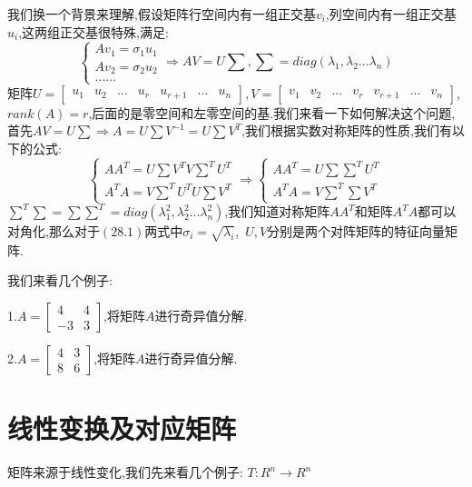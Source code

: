 \documentclass[oneside]{book}
\begin{document}
	我们换一个背景来理解,假设矩阵行空间内有一组正交基$v_{i}$,列空间内有一组正交基$u_{i}$,这两组正交基很特殊,满足:$$\left\{\begin{array}{c}
		Av_{1}=\sigma_{1}u_{1}\\Av_{2}=\sigma_{2}u_{2}\\......
	\end{array}\right.\Rightarrow AV=U\sum,\sum=diag(\lambda_{1},\lambda_{2}...\lambda_{n})$$
	矩阵$U=\left[\begin{array}{ccccccc}
		u_{1}&u_{2}&...&u_{r}&u_{r+1}&...&u_{n}
	\end{array}\right],V=\left[\begin{array}{ccccccc}
	v_{1}&v_{2}&...&v_{r}&v_{r+1}&...&v_{n}
\end{array}\right]$,$rank(A)=r$,后面的是零空间和左零空间的基.我们来看一下如何解决这个问题,首先$AV=U\sum\Rightarrow A=U\sum V^{-1}=U\sum V^{T}$,我们根据实数对称矩阵的性质,我们有以下的公式:
\begin{equation}
	\left\{\begin{array}{c}
		AA^{T}=U\sum V^{T}V\sum^{T}U^{T}\\A^{T}A=V\sum^{T}U^{T}U\sum V^{T}
	\end{array}\right.\Rightarrow 	\left\{\begin{array}{c}
	AA^{T}=U\sum \sum^{T}U^{T}\\A^{T}A=V\sum^{T}\sum V^{T}
\end{array}\right.
\end{equation}
$\sum^{T}\sum=\sum\sum^{T}=diag(\lambda_{1}^{2},\lambda_{2}^{2}...\lambda_{n}^{2})$,我们知道对称矩阵$AA^{T}$和矩阵$A^{T}A$都可以对角化,那么对于$(28.1)$两式中$\sigma_{i}=\sqrt{\lambda_{i}}$,\ $U,V$分别是两个对阵矩阵的特征向量矩阵.

我们来看几个例子:

1.$A=\left[\begin{array}{cc}
	4&4\\-3&3
\end{array}\right]$,将矩阵$A$进行奇异值分解.
	
	2.$A=\left[\begin{array}{cc}
		4&3\\8&6
	\end{array}\right]$,将矩阵$A$进行奇异值分解.
	\chapter{线性变换及对应矩阵}
	矩阵来源于线性变化,我们先来看几个例子:
	$T:R^{n}\rightarrow R^{n}$
	
\end{document}
